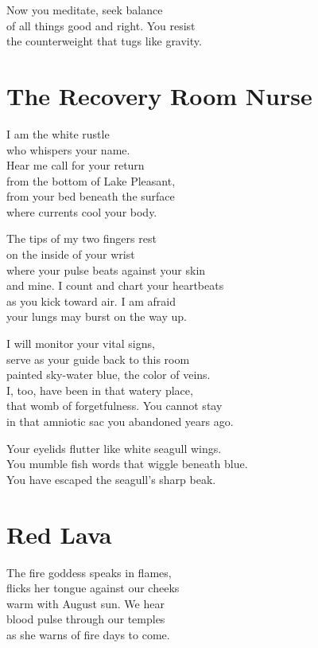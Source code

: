 \documentclass[twoside,10pt]{book}
\begin{document}
Now you meditate, seek balance\\
of all things good and right. You resist\\
the counterweight that tugs like gravity.


\clearpage
\section{The Recovery Room Nurse}

I am the white rustle\\
who whispers your name.\\
Hear me call for your return\\
from the bottom of Lake Pleasant,\\
from your bed beneath the surface\\
where currents cool your body.

The tips of my two fingers rest\\
on the inside of your wrist\\
where your pulse beats against your skin\\
and mine. I count and chart your heartbeats\\
as you kick toward air. I am afraid\\
your lungs may burst on the way up.

I will monitor your vital signs,\\
serve as your guide back to this room\\
painted sky-water blue, the color of veins.\\
I, too, have been in that watery place,\\
that womb of forgetfulness. You cannot stay\\
in that amniotic sac you abandoned years ago.

Your eyelids flutter like white seagull wings.\\
You mumble fish words that wiggle beneath blue.\\
You have escaped the seagull's sharp beak.


\clearpage
\section{Red Lava}

The fire goddess speaks in flames,\\
flicks her tongue against our cheeks\\
warm with August sun. We hear\\
blood pulse through our temples\\
as she warns of fire days to come.
\end{document}
